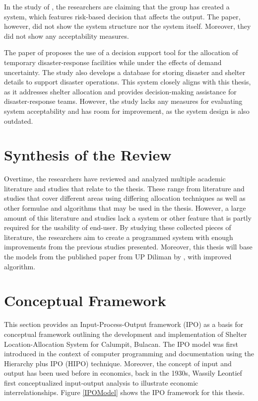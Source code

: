 	In the study of \textcite{Amir2023}, the researchers are claiming that the group has created a system, which features risk-based decision that affects the output. The paper, however, did not show the system structure nor the system itself. Moreover, they did not show any acceptability measures. \parencite{Amir2023}
	
	 The paper of \textcite{Cavdur2019} proposes the use of a decision support tool for the allocation of temporary disaster-response facilities while under the effects of demand uncertainty. The study also develops a database for storing disaster and shelter details to support disaster operations. This system closely aligns with this thesis, as it addresses shelter allocation and provides decision-making assistance for disaster-response teams. However, the study lacks any measures for evaluating system acceptability and has room for improvement, as the system design is also outdated.

\section{Synthesis of the Review}
	Overtime, the researchers have reviewed and analyzed multiple academic literature and studies that relate to the thesis. These range from literature and studies that cover different areas using differing allocation techniques as well as other formulae and algorithms that may be used in the thesis. However, a large amount of this literature and studies lack a system or other feature that is partly required for the usability of end-user. By studying these collected pieces of literature, the researchers aim to create a programmed system with enough improvements from the previous studies presented. Moreover, this thesis will base the models from the published paper from UP Diliman by \textcite{LeahUP}, with improved algorithm.

\section{Conceptual Framework}
	This section provides an Input-Process-Output framework (IPO) as a basis for conceptual framework outlining the development and implementation of Shelter Location-Allocation System for Calumpit, Bulacan. The IPO model was first introduced in the context of computer programming and documentation using the Hierarchy plus IPO (HIPO) technique. Moreover, the concept of input and output has been used before in economics, back in the 1930s, Wassily Leontief first conceptualized input-output analysis to illustrate economic interrelationships. Figure \ref{IPOModel} shows the IPO framework for this thesis.
	
